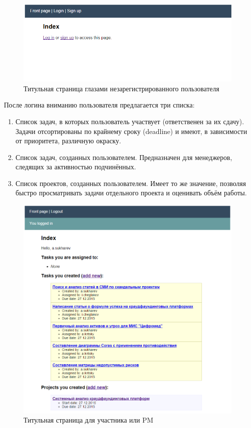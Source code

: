 \documentclass[a4paper, 14pt]{extarticle}
\begin{document}
\begin{figure}[!htb]
  \centering
    \includegraphics[scale=0.75]{../shared_images/frontend/title-not-logged-in.png}
   \caption{Титульная страница глазами незарегистрированного пользователя}
    \label{fig:start}
\end{figure}

После логина вниманию пользователя предлагается три списка:

\begin{enumerate}
\item Список задач, в которых пользователь участвует (ответственен за их сдачу). Задачи отсортированы по крайнему сроку (deadline) и имеют, в зависимости от приоритета, различную окраску.
\item Список задач, созданных пользователем. Предназначен для менеджеров, следящих за активностью подчинённых.
\item Список проектов, созданных пользователем. Имеет то же значение, позволяя быстро просматривать задачи отдельного проекта и оценивать объём работы.
\end{enumerate}

\newpage

\begin{figure}[!htb]
  \centering
    \includegraphics[scale=0.8]{../shared_images/frontend/title-logged-in.png}
   \caption{Титульная страница для участника или PM}
    \label{fig:start}
\end{figure}
\end{document}
